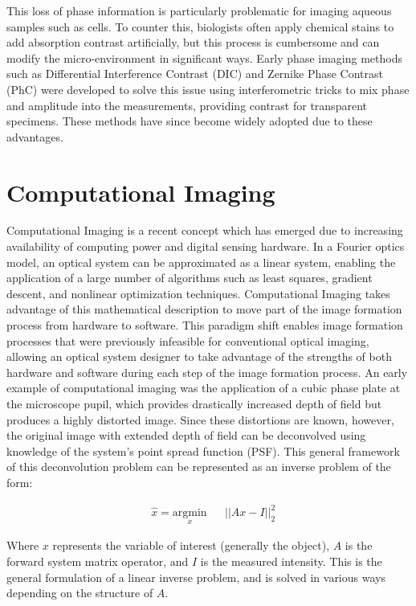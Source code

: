 This loss of phase information is particularly problematic for imaging aqueous samples such as cells. To counter this, biologists often apply chemical stains to add absorption contrast artificially, but this process is cumbersome and can modify the micro-environment in significant ways. Early phase imaging methods such as Differential Interference Contrast (DIC)\cite{smithDIC} and Zernike Phase Contrast (PhC) \cite{zernike1955discovered} were developed to solve this issue using interferometric tricks to mix phase and amplitude into the measurements, providing contrast for transparent specimens. These methods have since become widely adopted due to these advantages.

\section{Computational Imaging}
Computational Imaging is a recent concept which has emerged due to increasing availability of computing power and digital sensing hardware. In a Fourier optics model, an optical system can be approximated as a linear system, enabling the application of a large number of algorithms such as least squares, gradient descent, and nonlinear optimization techniques. Computational Imaging takes advantage of this mathematical description to move part of the image formation process from hardware to software. This paradigm shift enables image formation processes that were previously infeasible for conventional optical imaging, allowing an optical system designer to take advantage of the strengths of both hardware and software during each step of the image formation process.  An early example of computational imaging was the application of a cubic phase plate at the microscope pupil, which provides drastically increased depth of field but produces a highly distorted image. Since these distortions are known, however, the original image with extended depth of field can be deconvolved using knowledge of the system's point spread function (PSF)\cite{Dowski:95}. This general framework of this deconvolution problem can be represented as an inverse problem of the form:

\begin{equation}
\begin{aligned}
& \hat{x} = \underset{x}{\text{argmin}}
& & ||Ax-I ||_2^2
\end{aligned}
\end{equation}

Where $x$ represents the variable of interest (generally the object), $A$ is the forward system matrix operator, and $I$ is the measured intensity. This is the general formulation of a linear inverse problem, and is solved in various ways depending on the structure of $A$.

